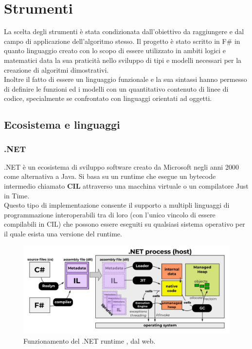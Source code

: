 \documentclass[\main/tesi.tex]{subfiles}
\begin{document}
\chapter{Strumenti}

La scelta degli strumenti è stata condizionata dall'obiettivo da raggiungere e dal campo di applicazione dell'algoritmo stesso.
Il progetto è stato scritto in F\# \cite{fsharp} in quanto linguaggio creato con lo scopo di essere utilizzato in ambiti logici e matematici data la sua praticità nello sviluppo di tipi e modelli necessari per la creazione di algoritmi dimostrativi. \\
Inoltre il fatto di essere un linguaggio funzionale e la sua sintassi hanno permesso di definire le funzioni ed i modelli con un quantitativo contenuto di linee di codice, specialmente se confrontato con linguaggi orientati ad oggetti. \\

\section{Ecosistema e linguaggi}
\subsection{.NET}
.NET è un ecosistema di sviluppo software creato da Microsoft negli anni 2000 come alternativa a Java. Si basa su un runtime che esegue un bytecode intermedio chiamato \textbf{CIL} \cite{cil} attraverso una macchina virtuale o un compilatore Just in Time.\\
Questo tipo di implementazione consente il supporto a multipli linguaggi di programmazione interoperabili tra di loro (con l'unico vincolo di essere compilabili in CIL) che possono essere eseguiti su qualsiasi sistema operativo per il quale esista una versione del runtime.

\begin{figure}[h]
    \caption{Funzionamento del .NET runtime \cite{dotnet}, dal web.}
    \includegraphics[width=\textwidth]{../images/dotnet.png}
\end{figure}
\end{document}
